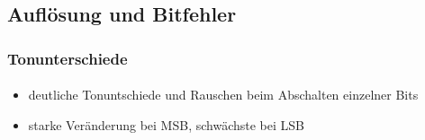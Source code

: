 \subsection{Auflösung und Bitfehler} %
\label{sub:Auflösung_und_Bitfehler}
\begin{frame}
    \frametitle{Tonunterschiede}
    \framesubtitle{}
    \begin{block}{}
        \begin{itemize}
            \item deutliche Tonuntschiede und Rauschen beim Abschalten
            einzelner Bits
            \item starke Veränderung bei MSB, schwächste bei LSB
        \end{itemize}
    \end{block}
\end{frame}

